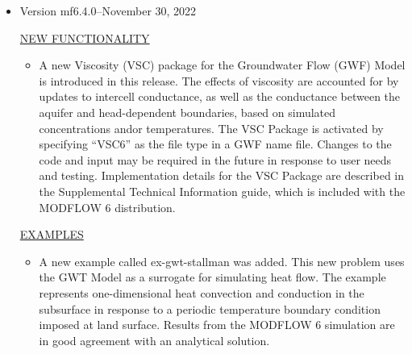 \documentclass[11pt,twoside,twocolumn]{usgsreport}
\begin{document}
\begin{itemize}
	
	\item Version mf6.4.0--November 30, 2022
	
	\underline{NEW FUNCTIONALITY}
	\begin{itemize}
		\item A new Viscosity (VSC) package for the Groundwater Flow (GWF) Model is introduced in this release.  The effects of viscosity are accounted for by updates to intercell conductance, as well as the conductance between the aquifer and head-dependent boundaries, based on simulated concentrations and\/or temperatures.  The VSC Package is activated by specifying ``VSC6'' as the file type in a GWF name file.  Changes to the code and input may be required in the future in response to user needs and testing.  Implementation details for the VSC Package are described in the Supplemental Technical Information guide, which is included with the MODFLOW 6 distribution.  
	\end{itemize}

	\underline{EXAMPLES}
	\begin{itemize}
		\item A new example called ex-gwt-stallman was added.  This new problem uses the GWT Model as a surrogate for simulating heat flow.  The example represents one-dimensional heat convection and conduction in the subsurface in response to a periodic temperature boundary condition imposed at land surface.  Results from the MODFLOW 6 simulation are in good agreement with an analytical solution.
	\end{itemize}


\end{itemize}
\end{document}
